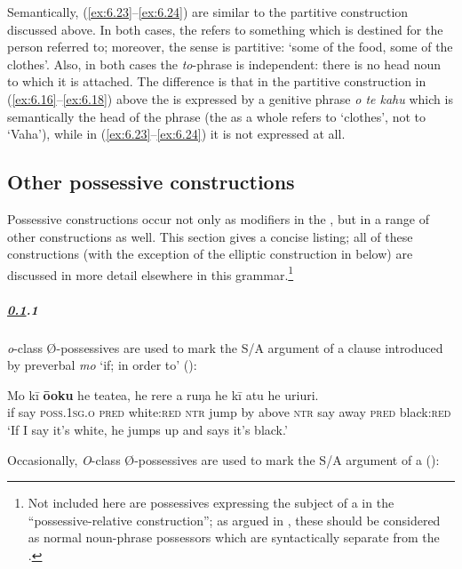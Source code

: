 Semantically, (\ref{ex:6.23}–\ref{ex:6.24}) are similar to the partitive construction discussed above. In both cases, the  refers to something which is destined for the person referred to; moreover, the sense is partitive: ‘some of the food, some of the clothes’. Also, in both cases the \textit{to}{}-phrase is independent: there is no head noun to which it is attached. The difference is that in the partitive construction in (\ref{ex:6.16}–\ref{ex:6.18}) above the  is expressed by a genitive phrase \textit{o te kahu} which is semantically the head of the phrase (the  as a whole refers to ‘clothes’, not to ‘Vaha’), while in (\ref{ex:6.23}–\ref{ex:6.24}) it is not expressed at all.
\subsection{Other possessive constructions}\label{sec:6.2.3}

Possessive constructions occur not only as modifiers in the , but in a range of other constructions as well. This section gives a concise listing; all of these constructions (with the exception of the elliptic construction in  below) are discussed in more detail elsewhere in this grammar.\footnote{\label{fn:287}Not included here are possessives expressing the subject of a  in the “possessive-relative construction”; as argued in , these should be considered as normal noun-phrase possessors which are syntactically separate from the .}
\subparagraph{\ref{sec:6.2.3}.1} \textit{o}{}-class Ø-possessives are used to mark the S/A argument of a clause introduced by preverbal \textit{mo} ‘if; in order to’ ():

\ea\label{ex:6.26}
\gll Mo kī \textbf{ō{\ꞌ}oku} he teatea, he rere a ruŋa he kī atu he {\ꞌ}uri{\ꞌ}uri. \\
if say \textsc{poss.1sg.o} \textsc{pred} white:\textsc{red} \textsc{ntr} jump by above \textsc{ntr} say away \textsc{pred} black:\textsc{red} \\

\glt
‘If I say it’s white, he jumps up and says it’s black.’ \textstyleExampleref{[R480.003]} 
\z

Occasionally, \textit{O}-class Ø-possessives are used to mark the S/A argument of a  ():

